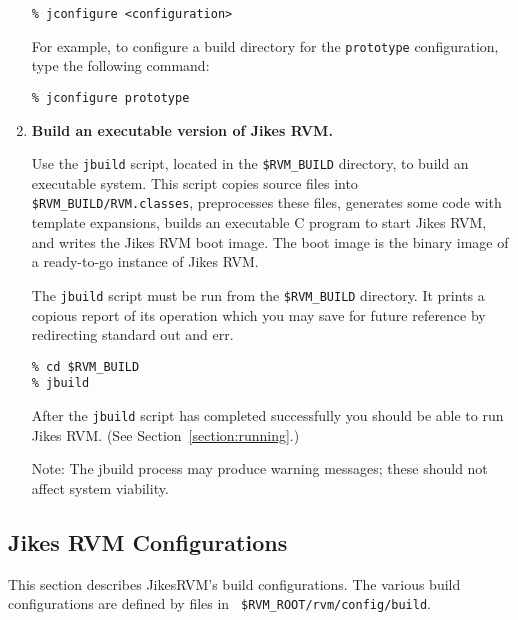 \begin{enumerate}
\begin{verbatim}
% jconfigure <configuration>
\end{verbatim}

For example, to configure a build directory for the 
{\tt prototype} configuration, type the following command:

\begin{verbatim}
% jconfigure prototype
\end{verbatim}

\item {\bf Build an executable version of Jikes RVM.}  

Use the {\tt jbuild} script, located in the {\tt \$RVM\_BUILD} directory,
to build an executable system.  This script copies source files into
{\tt \$RVM\_BUILD/RVM.classes}, preprocesses these files, generates
some code with template expansions, builds an executable C program to
start Jikes RVM, and writes the Jikes RVM boot image.  The boot
image is the binary image of a ready-to-go instance of Jikes RVM.

The {\tt jbuild} script must be run from the {\tt \$RVM\_BUILD}
directory. It prints a copious report of its operation which you may
save for future reference by redirecting standard out and err.

\begin{verbatim}
% cd $RVM_BUILD
% jbuild
\end{verbatim}


After the {\tt jbuild} script has completed successfully you should be able 
to run Jikes RVM.  (See Section~\ref{section:running}.)

Note: The jbuild process may produce warning messages; these should not
affect system viability.

\end{enumerate}

\AIXPPCJikesTMFooter

\subsection{Jikes RVM Configurations}\label{configs}

This section describes Jikes\trademark RVM's build configurations.
The various build configurations are defined by files in {\tt
\$RVM\_ROOT/rvm/config/build}.

